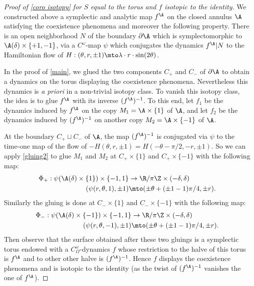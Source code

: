 \begin{proof}[Proof of \cref{coro isotopy} for $S$ equal to the torus and $f$ isotopic to the identity]
We constructed above a symplectic and analytic map $f^\A$ on the closed annulus $\A $ satisfying the coexistence phenomena and moreover the following property.
There is an open neighborhood $N$ of the boundary $\partial \A$ which is symplectomorphic to $\A(\delta)\times \{+1,-1\}$, via a $C^\omega$-map $ \psi$ which conjugates the dynamics $f^\A|N$ to the Hamiltonian flow of $H: (\theta,r, \pm1)\mto \lambda\cdot r\cdot \sin(2\theta)$.

In the proof of \cref{main}, we glued the two components $C_+$ and $C_-$ of $\partial \A$ to obtain a dynamics on the torus displaying the coexistence phenomena. Nevertheless this dynamics is \emph{a priori} in a non-trivial isotopy class. To vanish this isotopy class, the idea is to glue $f^\A$ with its inverse $(f^\A)^{-1}$. To this end, let $f_1$ be the dynamics induced by $f^\A$ on the copy
$M_1=\A\times \{1\}$ of $\A$, and let $f_2 $ be the dynamics induced by $(f^\A)^{-1}$ on another copy
$M_2=\A\times \{-1\}$ of $\A$.

At the boundary $C_+\sqcup C_-$ of $\A$, the map $(f^\A)^{-1}$ is conjugated via $\psi$ to the time-one map of the flow of $-H(\theta, r,\pm1)= H(-\theta -\pi/2, -r,\pm1)$. So we can apply \cref{gluing2} to glue $M_1$ and $M_2$ at $C_+\times \{1\}$ and $C_+\times \{-1\}$ with the following map:
\begin{align*}
\Phi_+: \psi(\A(\delta)\times \{1\})\times \{-1,1\}&\to \R/\pi\Z\times (-\delta,\delta)\\
(\psi(r,\theta,1),\pm1) &\mto (\pm \theta+(\pm1-1)\pi/4,\pm r).
\end{align*}
Similarly the gluing is done at $C_-\times \{1\}$ and $C_-\times \{-1\}$ with the following map:
\begin{align*}
\Phi_-:\psi(\A(\delta)\times \{-1\})\times \{-1,1\}&\to \R/\pi\Z\times (-\delta,\delta)\\
(\psi(r,\theta,-1),\pm1) &\mto (\pm \theta+(\pm1-1)\pi/4,\pm r).
\end{align*}
Then observe that the surface obtained after these two gluings is a symplectic torus endowed with a $C^\omega_\Omega$-dynamics $f$ whose restriction to the halve of this torus is $f^\A$ and to other other halve is $(f^\A)^{-1}$. Hence $f$ displays the coexistence phenomena and is isotopic to the identity (as the twist of $(f^\A)^{-1}$ vanishes the one of $f^\A$).
\end{proof}
